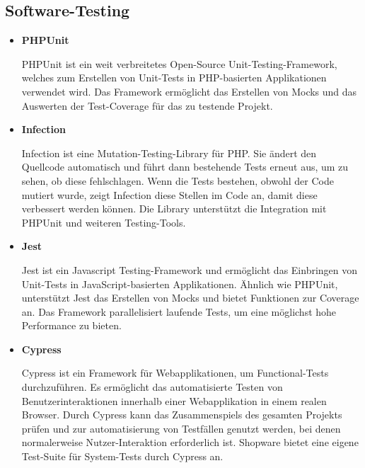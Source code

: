 \subsection*{Software-Testing}

\begin{itemize}
    \item {
        \textbf{PHPUnit}\par
        PHPUnit ist ein weit verbreitetes Open-Source Unit-Testing-Framework, welches zum Erstellen von
        Unit-Tests in PHP-basierten Applikationen verwendet wird.
        Das Framework ermöglicht das Erstellen von Mocks und das Auswerten der Test-Coverage für das zu
        testende Projekt.
    }

    \item {
        \textbf{Infection}\par
        Infection ist eine Mutation-Testing-Library für PHP.
        Sie ändert den Quellcode automatisch und führt dann bestehende Tests erneut aus, um zu sehen, ob diese
        fehlschlagen.
        Wenn die Tests bestehen, obwohl der Code mutiert wurde, zeigt Infection diese Stellen im Code an, damit
        diese verbessert werden können.
        Die Library unterstützt die Integration mit PHPUnit und weiteren Testing-Tools.
    }

    \item {
        \textbf{Jest}\par
        Jest ist ein Javascript Testing-Framework und ermöglicht das Einbringen von Unit-Tests in
        JavaScript-basierten Applikationen.
        Ähnlich wie PHPUnit, unterstützt Jest das Erstellen von Mocks und bietet Funktionen zur Coverage an.
        Das Framework parallelisiert laufende Tests, um eine möglichst hohe Performance zu bieten.
    }

    \item {
        \textbf{Cypress}\par
        Cypress ist ein Framework für Webapplikationen, um Functional-Tests durchzuführen.
        Es ermöglicht das automatisierte Testen von Benutzerinteraktionen innerhalb einer Webapplikation in
        einem realen Browser.
        Durch Cypress kann das Zusammenspiels des gesamten Projekts prüfen und zur automatisierung
        von Testfällen genutzt werden, bei denen normalerweise Nutzer-Interaktion erforderlich ist.
        Shopware bietet eine eigene Test-Suite für System-Tests durch Cypress an.
    }
\end{itemize}

